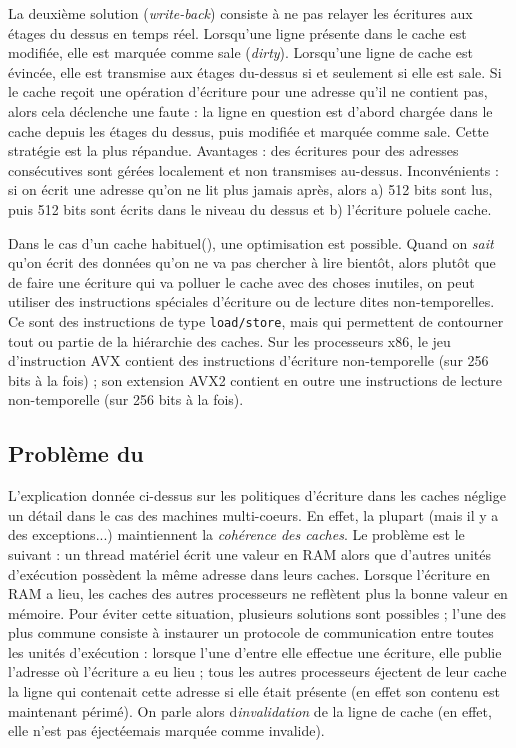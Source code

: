La deuxième solution (\og \emph{write-back}) consiste à ne pas relayer les
écritures aux étages du dessus en temps réel. Lorsqu'une ligne présente dans le
cache est modifiée, elle est marquée comme \og sale\fg
(\emph{dirty}). Lorsqu'une ligne de cache est évincée, elle est transmise aux
étages du-dessus si et seulement si elle est sale. Si le cache reçoit une
opération d'écriture pour une adresse qu'il ne contient pas, alors cela
déclenche une faute : la ligne en question est d'abord chargée dans le cache
depuis les étages du dessus, puis modifiée et marquée comme sale. Cette
stratégie est la plus répandue. Avantages : des écritures pour des adresses
consécutives sont gérées localement et non transmises au-dessus. Inconvénients :
si on écrit une adresse qu'on ne lit plus jamais après, alors a) 512 bits sont
lus, puis 512 bits sont écrits dans le niveau du dessus et b) l'écriture \og
polue\fg le cache.

\begin{danger}
  Dans le cas d'un cache \og habituel\fg (), une
  optimisation est possible. Quand on \emph{sait} qu'on écrit des données qu'on
  ne va pas chercher à lire bientôt, alors plutôt que de faire une écriture qui
  va polluer le cache avec des choses inutiles, on peut utiliser des
  instructions spéciales d'écriture ou de lecture dites \og
  non-temporelles\fg. Ce sont des instructions de type \texttt{load/store}, mais
  qui permettent de contourner tout ou partie de la hiérarchie des caches. Sur
  les processeurs \textsf{x86}, le jeu d'instruction \textsf{AVX} contient des
  instructions d'écriture non-temporelle (sur 256 bits à la fois) ; son
  extension \textsf{AVX2} contient en outre une instructions de lecture
  non-temporelle (sur 256 bits à la fois).
\end{danger}

\subsection{Problème du \og {}\fg} L'explication donnée
ci-dessus sur les politiques d'écriture dans les caches néglige un détail dans
le cas des machines multi-coeurs. En effet, la plupart (mais il y a des
exceptions...)  maintiennent la \emph{cohérence des caches}. Le problème est le
suivant : un thread matériel écrit une valeur en RAM alors que d'autres unités
d'exécution possèdent la même adresse dans leurs caches. Lorsque l'écriture en
RAM a lieu, les caches des autres processeurs ne reflètent plus la bonne valeur
en mémoire. Pour éviter cette situation, plusieurs solutions sont possibles ;
l'une des plus commune consiste à instaurer un protocole de communication entre
toutes les unités d'exécution : lorsque l'une d'entre elle effectue une
écriture, elle publie l'adresse où l'écriture a eu lieu ; tous les autres
processeurs éjectent de leur cache la ligne qui contenait cette adresse si elle
était présente (en effet son contenu est maintenant périmé). On parle alors
d\emph{invalidation} de la ligne de cache (en effet, elle n'est pas \og
éjectée\fg mais marquée comme \og invalide\fg).

